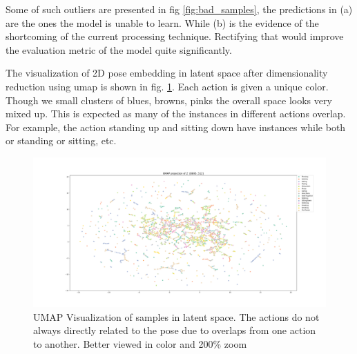 Some of such outliers are presented in fig \ref{fig:bad_samples}, the predictions in (a) are the ones the model is unable to learn. While (b) is the evidence of the shortcoming of the current processing technique. Rectifying that would improve the evaluation metric of the model quite significantly.



The visualization of 2D pose embedding in latent space after dimensionality reduction using \ac{umap} is shown in fig. \ref{fig:latentspace}. Each action is given a unique color. Though we small clusters of blues, browns, pinks the overall space looks very mixed up. This is expected as many of the instances in different actions overlap. For example, the action standing up and sitting down have instances while both or standing or sitting, etc.  

\begin{figure}[h]
    \centering
    \includegraphics[width=\textwidth]{figures/results/umap.png}
    \caption{UMAP Visualization of samples in latent space. The actions do not always directly related to the pose due to overlaps from one action to another. Better viewed in color and 200\% zoom}
    \label{fig:latentspace}
\end{figure}